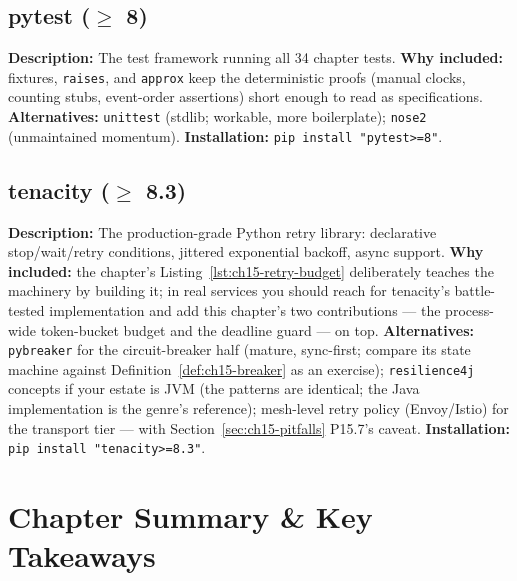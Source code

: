 \subsection{pytest ($\geq$ 8)}
\textbf{Description:} The test framework running all 34 chapter tests.
\textbf{Why included:} fixtures, \texttt{raises}, and \texttt{approx} keep
the deterministic proofs (manual clocks, counting stubs, event-order
assertions) short enough to read as specifications. \textbf{Alternatives:}
\texttt{unittest} (stdlib; workable, more boilerplate); \texttt{nose2}
(unmaintained momentum). \textbf{Installation:}
\texttt{pip install "pytest>=8"}.

\subsection{tenacity ($\geq$ 8.3)}
\textbf{Description:} The production-grade Python retry library:
declarative stop/wait/retry conditions, jittered exponential backoff,
async support. \textbf{Why included:} the chapter's
Listing~\ref{lst:ch15-retry-budget} deliberately teaches the machinery by
building it; in real services you should reach for tenacity's
battle-tested implementation and add this chapter's two contributions ---
the process-wide token-bucket budget and the deadline guard --- on top.
\textbf{Alternatives:} \texttt{pybreaker} for the circuit-breaker half
(mature, sync-first; compare its state machine against
Definition~\ref{def:ch15-breaker} as an exercise); \texttt{resilience4j}
concepts if your estate is JVM (the patterns are identical; the Java
implementation is the genre's reference); mesh-level retry policy
(Envoy/Istio) for the transport tier --- with
Section~\ref{sec:ch15-pitfalls} P15.7's caveat. \textbf{Installation:}
\texttt{pip install "tenacity>=8.3"}.

\section{Chapter Summary \& Key Takeaways}
\label{sec:ch15-summary}

